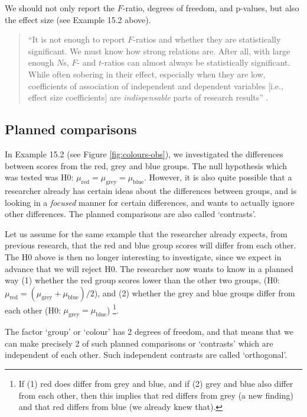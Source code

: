\documentclass[
]{book}
\begin{document}
We should not only report the \(F\)-ratio, degrees of freedom,
and p-values, but also the effect size (see
Example 15.2 above).

\begin{quote}
``It is not enough to report
\(F\)-ratios and whether they are statistically significant. We must know
how strong relations are. After all, with large enough \(N\)s, \(F\)- and
\(t\)-ratios can almost always be statistically significant. While often
sobering in their effect, especially when they are low, coefficients of
association of independent and dependent variables {[}i.e., effect size
coefficients{]} are \emph{indispensable} parts of research results'' \citep[ p.327, emphasis added]{KL00}.
\end{quote}

\subsection{Planned comparisons}\label{sec:anova-oneway-planned}

In Example 15.2 (see
Figure \ref{fig:colours-obs}), we investigated the differences between
scores from the red, grey and blue groups. The null hypothesis which was tested
was H0:
\(\mu_\textrm{red} = \mu_\textrm{grey} = \mu_\textrm{blue}\).
However, it is also quite possible that a researcher already has
certain ideas about the differences between groups, and is looking in a
\emph{focused} manner for certain differences, and wants to actually ignore other
differences. The planned comparisons are also called `contrasts'.

Let us assume for the same example that the researcher already expects,
from previous research, that the red and blue group scores will differ from
each other. The H0 above is then no longer interesting to investigate, since
we expect in advance that we will reject H0. The researcher now wants to know
in a planned way (1) whether the red group scores lower than the other two groups,
(H0: \(\mu_\textrm{red} = (\mu_\textrm{grey}+\mu_\textrm{blue})/2\)),
and (2)
whether the grey and blue groups differ from each other (H0:
\(\mu_\textrm{grey} = \mu_\textrm{blue}\))
\footnote{If (1) red does differ from grey and blue, and if (2) grey and blue
  also differ from each other, then this implies that red differs from grey (a new
  finding) and that red differs from blue (we already knew that).}.

The factor `group' or `colour' has 2 degrees of freedom, and that means that we
can make precisely 2 of such planned comparisons or `contrasts' which are
independent of each other. Such independent contrasts
are called `orthogonal'.
\end{document}
